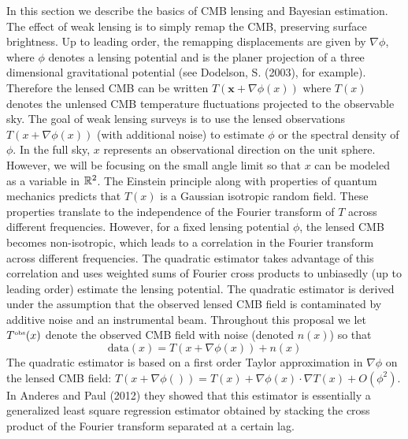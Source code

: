 \documentclass[noinfoline]{imsart}
\newcommand{\bx}{\boldsymbol x}
\begin{document}
In this section we describe the  basics of CMB lensing and Bayesian estimation.  The effect of weak lensing is to simply remap the CMB, preserving surface brightness.   Up to leading order, the remapping  displacements are given by $\nabla \phi$, where $\phi$ denotes a lensing potential and is the planer projection of a three dimensional gravitational potential (see Dodelson, S. (2003), for example). Therefore the lensed CMB can  be written $T(\bx + \nabla \phi(x))$ where $T(x)$ denotes the unlensed CMB temperature fluctuations projected to the observable sky.
The goal of weak lensing surveys is to use the lensed observations $T(x + \nabla \phi(x))$  (with additional noise) to  estimate $\phi$ or the spectral density of $\phi$.  In the full sky, $x$ represents an observational direction on the unit sphere. However, we will be focusing on the small angle limit  so that $x$ can be modeled as a variable in $ \Bbb R^2$.  The Einstein principle along with properties of quantum mechanics predicts that $T(x)$   is a Gaussian  isotropic random field. These properties translate to  the independence of the Fourier transform of $T$ across different frequencies.
 However, for a fixed lensing potential $\phi$, the lensed CMB  becomes non-isotropic, which leads to a correlation in the Fourier transform across different frequencies. The quadratic estimator   takes advantage of this correlation and uses weighted sums of Fourier  cross products to unbiasedly (up to leading order) estimate the lensing potential.
The quadratic estimator is derived under the assumption that the observed lensed CMB field is contaminated by additive noise and an instrumental beam. Throughout this proposal we let  $T^\text{\tiny obs}(x)$ denote the observed CMB field  with  noise (denoted $n(x)$) so that  
\[ \text{data}(x)= T(x + \nabla \phi(x))+ n(x)
 \]
The quadratic estimator is based on a first order Taylor approximation in $\nabla \phi $ on the lensed CMB field:
$T(x+\nabla \phi())= T(x) + \nabla \phi(x)\cdot \nabla T(x)+ O(\phi^2)$. 
In Anderes and Paul (2012) they showed that this estimator is essentially  a generalized least square regression estimator obtained by stacking the cross product of the Fourier transform separated at a certain lag.
\end{document}
